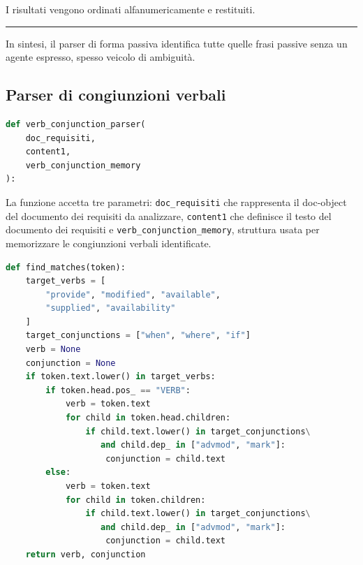 \documentclass[12pt]{report}
\begin{document}
\noindent I risultati vengono ordinati alfanumericamente e restituiti.

{\centering \rule{0.5\linewidth}{0.1pt} \par\vspace{0.25cm}}

In sintesi, il \textsf{parser di forma passiva} identifica tutte quelle frasi passive senza un agente espresso, spesso veicolo di ambiguità.


\subsection{Parser di congiunzioni verbali}

\begin{mdframed}
\small
\begin{lstlisting}[language=Python]
def verb_conjunction_parser(
    doc_requisiti,
    content1,
    verb_conjunction_memory
):
\end{lstlisting}
\end{mdframed}

\noindent La funzione accetta tre parametri: \texttt{doc\_requisiti} che rappresenta il doc-object del documento dei requisiti da analizzare, \texttt{content1} che definisce il testo del documento dei requisiti e \texttt{verb\_conjunction\_memory}, struttura usata per memorizzare le congiunzioni verbali identificate.

\begin{mdframed}
\small
\begin{lstlisting}[language=Python]
def find_matches(token):
    target_verbs = [
        "provide", "modified", "available",
        "supplied", "availability"
    ]
    target_conjunctions = ["when", "where", "if"]
    verb = None
    conjunction = None
    if token.text.lower() in target_verbs:
        if token.head.pos_ == "VERB":
            verb = token.text
            for child in token.head.children:
                if child.text.lower() in target_conjunctions\
                   and child.dep_ in ["advmod", "mark"]:
                    conjunction = child.text
        else:
            verb = token.text
            for child in token.children:
                if child.text.lower() in target_conjunctions\
                   and child.dep_ in ["advmod", "mark"]:
                    conjunction = child.text
    return verb, conjunction
\end{lstlisting}
\end{mdframed}
\end{document}
